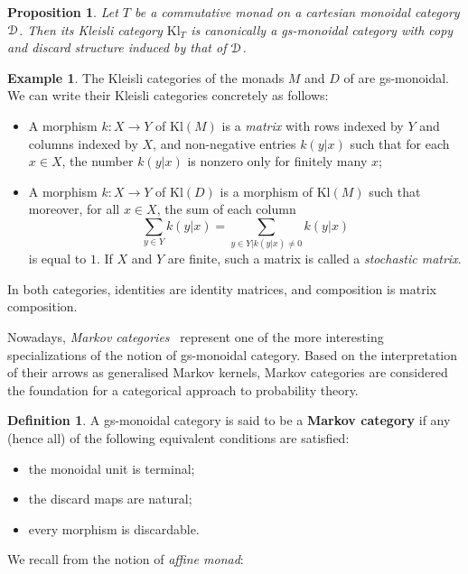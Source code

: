 \documentclass[a4paper,UKenglish,numberwithinsect,cleveref, autoref, thm-restate]{lipics-v2021}
\theoremstyle{plain} %
\newtheorem{myproposition}[mytheorem]{Proposition}
\theoremstyle{definition} %
\newtheorem{mydefinition}[mytheorem]{Definition}
\newtheorem{myexample}[mytheorem]{Example}
\begin{document}
\begin{myproposition}\label{monoidalgs}
 Let $T$ be a commutative monad on a cartesian monoidal category $\mathcal{D}$. 
 Then its Kleisli category $\mathrm{Kl}_T$ is canonically a gs-monoidal category with copy and discard structure induced by that of $\mathcal{D}$.
\end{myproposition}

\begin{myexample}\label{kleisliM}
 The Kleisli categories of the monads $M$ and $D$ of  are gs-monoidal. We can write their Kleisli categories concretely as follows:
 \begin{itemize}
  \item A morphism $k:X\to Y$ of $\mathrm{Kl}(M)$ is a \emph{matrix} with rows indexed by $Y$ and columns indexed by $X$, and non-negative entries $k(y|x)$ such that for each $x\in X$, the number $k(y|x)$ is nonzero only for finitely many $x$;
  \item A morphism $k:X\to Y$ of $\mathrm{Kl}(D)$ is a morphism of $\mathrm{Kl}(M)$ such that moreover, for all $x\in X$, the sum of each column
  \[
   \sum_{y\in Y} k(y|x) = \sum_{y\in Y|k(y|x)\ne 0} k(y|x)
  \]
  is equal to $1$. If $X$ and $Y$ are finite, such a matrix is called a \emph{stochastic matrix}.
 \end{itemize}
 In both categories, identities are identity matrices, and composition is matrix composition. 
\end{myexample}

Nowadays, \emph{Markov categories}~\cite{Fritz_2020} represent one of the more interesting specializations of the notion of gs-monoidal category. Based on the interpretation of their arrows
 as generalised Markov kernels, Markov categories are considered the foundation for a categorical approach to probability theory.

\begin{mydefinition}
 A gs-monoidal category is said to be a \textbf{Markov category} if any (hence all) of the following equivalent conditions are satisfied:
 \begin{itemize}
  \item the monoidal unit is terminal;
  \item the discard maps are natural;
  \item every morphism is discardable.
 \end{itemize}
\end{mydefinition}

We recall from \cite{Kock71,Jacobs1994} the notion of \emph{affine monad}:
\end{document}
